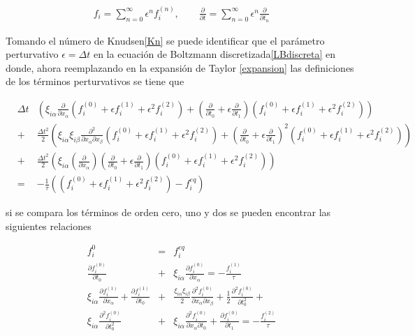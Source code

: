 \begin{eqnarray}
f_{i} = \sum_{n=0}^{\infty} \epsilon^{n} f_{i}^{(n)}, \qquad \frac{\partial}{\partial t} = \sum_{n = 0}^{\infty}\epsilon^{n}\frac{\partial}{\partial t_{n}}
\end{eqnarray}

\noindent Tomando el número de Knudsen\eqref{Kn} se puede identificar que el parámetro perturvativo $\epsilon = \Delta t$ en la ecuación de Boltzmann discretizada\eqref{LBdiscreta} \cite{principal} en donde, ahora reemplazando en la expansión de Taylor \eqref{expansion}  las definiciones de los términos perturvativos se tiene que 

\begin{eqnarray}
&\Delta t&\left(\xi_{i\alpha}\frac{\partial}{\partial x_{\alpha}}\left(f_{i}^{(0)}+\epsilon f_{i}^{(1)} + \epsilon^{2} f_{i}^{(2)}\right) + \left(\frac{\partial}{\partial t_{0}} + \epsilon \frac{\partial}{\partial t_{1}} \right)\left(f_{i}^{(0)}+\epsilon f_{i}^{(1)} + \epsilon^{2} f_{i}^{(2)}\right)\right)\nonumber \\
&+&\frac{\Delta t^{2}}{2}\left(\xi_{i\alpha}\xi_{i\beta}\frac{\partial^{2}}{\partial x_{\alpha}\partial x_{\beta}}\left(f_{i}^{(0)}+\epsilon f_{i}^{(1)} + \epsilon^{2} f_{i}^{(2)}\right)+\left(\frac{\partial}{\partial t_{0}} + \epsilon \frac{\partial}{\partial t_{1}} \right)^{2}\left(f_{i}^{(0)}+\epsilon f_{i}^{(1)} + \epsilon^{2} f_{i}^{(2)}\right)\right)\nonumber \\
&+&\frac{\Delta t^{2}}{2}\left(\xi_{i\alpha}\left(\frac{\partial}{\partial x_{\alpha}}\right)\left(\frac{\partial}{\partial t_{0}} + \epsilon \frac{\partial}{\partial t_{1}} \right)\left(f_{i}^{(0)}+\epsilon f_{i}^{(1)} + \epsilon^{2} f_{i}^{(2)}\right)\right) \nonumber\\
&=& -\frac{1}{\tau}\left(\left(f_{i}^{(0)}+\epsilon f_{i}^{(1)} + \epsilon^{2} f_{i}^{(2)}\right)-f_{i}^{eq}\right)
\end{eqnarray}

\noindent si se compara los términos de orden cero, uno y dos se pueden encontrar las siguientes relaciones 

\begin{eqnarray}
\label{momento0}
f_{i}^{0} &=& f_{i}^{eq} \\
\label{momento1}
\frac{\partial f_{i}^{(0)}}{\partial t_{0}} &+& \xi_{i\alpha}\frac{\partial f_{i}^{(0)}}{\partial x_{\alpha}} = -\frac{f_{i}^{(1)}}{\tau} \\
\xi_{i\alpha}\frac{\partial f_{i}^{(1)}}{\partial x_{\alpha}} + \frac{\partial f_{i}^{(1)}}{\partial t_{0}} &+& \frac{\xi_{i\alpha}\xi_{i\beta}}{2}\frac{\partial^{2}f_{i}^{(0)}}{\partial x_{\alpha}\partial x_{\beta}}+\frac{1}{2}\frac{\partial^{2}f_{i}^{(0)}}{\partial t_{0}^{2}}+\nonumber \\
\xi_{i\alpha}\frac{\partial^{2}f_{i}^{(0)}}{\partial t_{0}^{2}}&+&\xi_{i\alpha}\frac{\partial^{2}f_{i}^{(0)}}{\partial x_{\alpha}\partial t_{0}}+\frac{\partial f_{i}^{(0)}}{\partial t_{1}} = -\frac{f_{i}^{(2)}}{\tau} 
\end{eqnarray}

